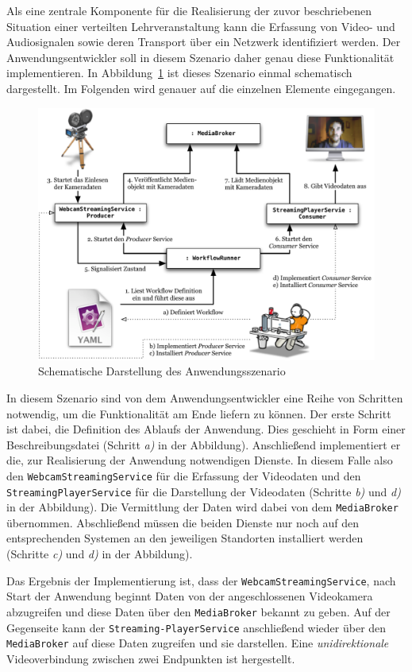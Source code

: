   Als eine zentrale Komponente für die Realisierung der zuvor beschriebenen Situation einer verteilten Lehrveranstaltung kann die Erfassung von Video- und Audiosignalen sowie deren Transport über ein Netzwerk identifiziert werden. Der Anwendungsentwickler soll in diesem Szenario daher genau diese Funktionalität implementieren. In Abbildung~\ref{fig:schema_des_anwendungsszenario} ist dieses Szenario einmal schematisch dargestellt. Im Folgenden wird genauer auf die einzelnen Elemente eingegangen.

\begin{figure}[ht]
  \centering
    \includegraphics[width=.9\textwidth]{images/Anwendungsszenario.pdf}
  \caption{Schematische Darstellung des Anwendungsszenario}
  \label{fig:schema_des_anwendungsszenario}
\end{figure}

  In diesem Szenario sind von dem Anwendungsentwickler eine Reihe von Schritten notwendig, um die Funktionalität am Ende liefern zu können. Der erste Schritt ist dabei, die Definition des Ablaufs der Anwendung. Dies geschieht in Form einer Beschreibungsdatei (Schritt \emph{a)} in der Abbildung). Anschließend implementiert er die, zur Realisierung der Anwendung notwendigen Dienste. In diesem Falle also den \verb!WebcamStreamingService!  für die Erfassung der Videodaten und den \verb!StreamingPlayerService! für die Darstellung der Videodaten (Schritte \emph{b)} und \emph{d)} in der Abbildung). Die Vermittlung der Daten wird dabei von dem \verb!MediaBroker! übernommen. Abschließend müssen die beiden Dienste nur noch auf den entsprechenden Systemen an den jeweiligen Standorten installiert werden (Schritte \emph{c)} und \emph{d)} in der Abbildung).
  
  Das Ergebnis der Implementierung ist, dass der \verb!WebcamStreamingService!, nach Start der Anwendung beginnt Daten von der angeschlossenen Videokamera abzugreifen und diese Daten über den \verb!MediaBroker! bekannt zu geben. Auf der Gegenseite kann der \verb!Streaming-PlayerService! anschließend wieder über den \verb!MediaBroker! auf diese Daten zugreifen und sie darstellen. Eine \emph{unidirektionale} Videoverbindung zwischen zwei Endpunkten ist hergestellt.


